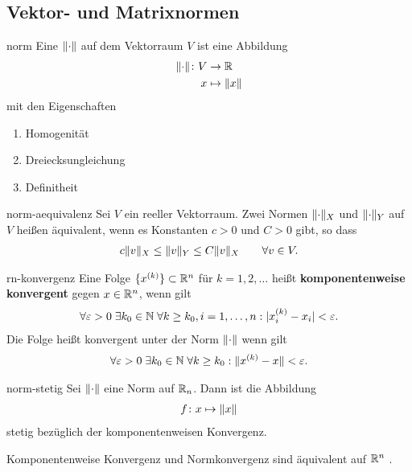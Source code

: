 
\subsection{Vektor- und Matrixnormen}

\begin{Definition}{norm}
  Eine  $\lVert\cdot\rVert$ auf dem Vektorraum $V$ ist eine Abbildung
  \begin{gather}
    \begin{split}
      \lVert\cdot\rVert\colon V &\to \mathbb R\\
      x&\mapsto \lVert x\rVert
    \end{split}
  \end{gather}
  mit den Eigenschaften
  \begin{enumerate}
  \item Homogenität
  \item Dreiecksungleichung
  \item Definitheit
  \end{enumerate}
\end{Definition}

\begin{Definition}{norm-aequivalenz}
  Sei $V$ ein reeller Vektorraum. Zwei Normen $\lVert\cdot\rVert_X$ und
  $\lVert\cdot\rVert_Y$ auf $V$ heißen äquivalent, wenn es Konstanten $c>0$
  und $C>0$ gibt, so dass
  \begin{gather}
    c \lVert v\rVert_X \le \lVert v\rVert_Y \le C \lVert v\rVert_X
    \qquad\forall v\in V.
  \end{gather}
\end{Definition}

\begin{Definition}{rn-konvergenz}
  Eine Folge $\{x^{(k)}\}\subset \mathbb R^n$ für $k=1,2,\dots$ heißt
  \textbf{komponentenweise konvergent} gegen $x\in \mathbb R^n$, wenn gilt
  \begin{gather}
    \forall \varepsilon>0\;
    \exists k_0\in \mathbb N\;
    \forall k\ge k_0, i=1,\dots,n
    : \lvert x^{(k)}_i - x_i\rvert < \varepsilon.
  \end{gather}
  Die Folge heißt konvergent unter der Norm $\lVert\cdot\rVert$ wenn gilt
  \begin{gather}
    \forall \varepsilon>0\;
    \exists k_0\in \mathbb N\;
    \forall k\ge k_0
    : \lVert x^{(k)} - x\rVert < \varepsilon.
  \end{gather}
\end{Definition}

\begin{Lemma}{norm-stetig}
  Sei $\lVert\cdot\rVert$ eine Norm auf $\mathbb R_n$. Dann ist die Abbildung
  \begin{gather}
    f\colon x \mapsto \lVert x\rVert
  \end{gather}
  stetig bezüglich der komponentenweisen
  Konvergenz.

  Komponentenweise Konvergenz und Normkonvergenz sind äquivalent auf
  $\mathbb R^n$ .
\end{Lemma}

